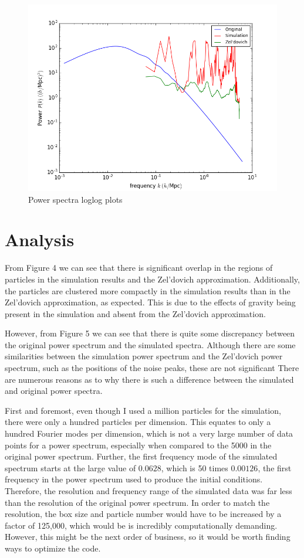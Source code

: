 \documentclass[12pt]{article}   	%
\begin{document}
\begin{figure}[h!]
\centering
\includegraphics[scale=0.85]{PSComparisonloglog.png}
\caption{Power spectra loglog plots}
\end{figure}

\clearpage

\section*{Analysis}
From Figure 4 we can see that there is significant overlap in the regions of particles in the
simulation results and the Zel'dovich approximation. Additionally, the particles are clustered
more compactly in the simulation results than in the Zel'dovich approximation, as expected. This is due 
to the effects of gravity being present in the simulation and absent from the Zel'dovich approximation.

However, from Figure 5 we can see that there is quite some discrepancy between the original power 
spectrum and the simulated spectra. Although there are some similarities between the simulation power 
spectrum and the Zel'dovich power spectrum, such as the positions of the noise peaks, these are not 
significant There are numerous reasons as to why there is such a difference between the simulated 
and original power spectra.

First and foremost, even though I used a million particles for the simulation, there were only a hundred
particles per dimension. This equates to only a hundred Fourier modes per dimension, which is not
a very large number of data points for a power spectrum, especially when compared to the 5000 in the 
original power spectrum. Further, the first frequency mode of the simulated spectrum
starts at the large value of $0.0628$, which is 50 times $0.00126$, the first frequency in the 
power spectrum used to produce the initial conditions. Therefore, the resolution and frequency range of 
the simulated data was far less than the resolution of the original power spectrum. In order to match the 
resolution, the box size and particle number would have to be increased by a factor of 125,000, which 
would be is incredibly computationally demanding. However, this might be the next order of business, 
so it would be worth finding ways to optimize the code.
\end{document}

